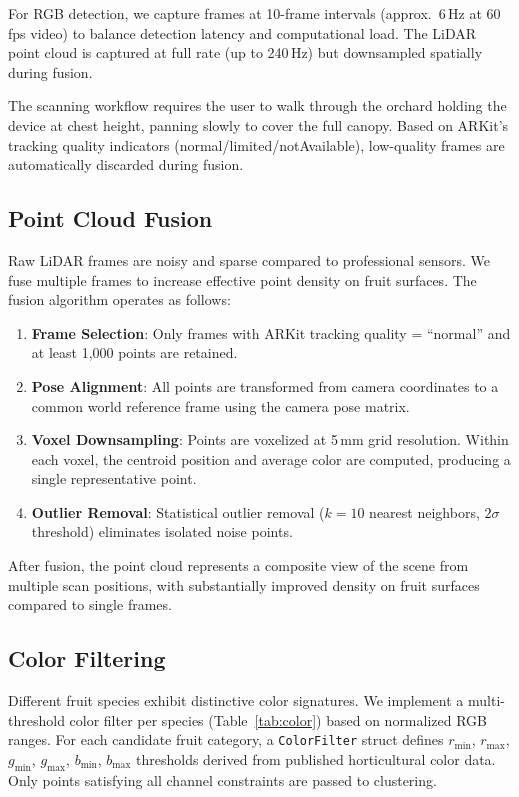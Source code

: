 \documentclass[12pt,a4paper]{article}
\begin{document}
For RGB detection, we capture frames at 10-frame intervals (approx.\ 6\,Hz at 60\,fps video) to balance detection latency and computational load. The LiDAR point cloud is captured at full rate (up to 240\,Hz) but downsampled spatially during fusion.

The scanning workflow requires the user to walk through the orchard holding the device at chest height, panning slowly to cover the full canopy. Based on ARKit's tracking quality indicators (normal/limited/notAvailable), low-quality frames are automatically discarded during fusion.

\subsection{Point Cloud Fusion}

Raw LiDAR frames are noisy and sparse compared to professional sensors. We fuse multiple frames to increase effective point density on fruit surfaces. The fusion algorithm operates as follows:

\begin{enumerate}
  \item \textbf{Frame Selection}: Only frames with ARKit tracking quality = ``normal'' and at least 1,000 points are retained.
  \item \textbf{Pose Alignment}: All points are transformed from camera coordinates to a common world reference frame using the camera pose matrix.
  \item \textbf{Voxel Downsampling}: Points are voxelized at 5\,mm grid resolution. Within each voxel, the centroid position and average color are computed, producing a single representative point.
  \item \textbf{Outlier Removal}: Statistical outlier removal ($k=10$ nearest neighbors, $2\sigma$ threshold) eliminates isolated noise points.
\end{enumerate}

After fusion, the point cloud represents a composite view of the scene from multiple scan positions, with substantially improved density on fruit surfaces compared to single frames.

\subsection{Color Filtering}

Different fruit species exhibit distinctive color signatures. We implement a multi-threshold color filter per species (Table~\ref{tab:color}) based on normalized RGB ranges. For each candidate fruit category, a \texttt{ColorFilter} struct defines $r_{\min}$, $r_{\max}$, $g_{\min}$, $g_{\max}$, $b_{\min}$, $b_{\max}$ thresholds derived from published horticultural color data. Only points satisfying all channel constraints are passed to clustering.
\end{document}

